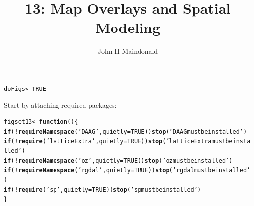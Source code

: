 \documentclass[12pt, a4paper,  BCOR=8.25mm, DIV=15]{scrartcl}\usepackage[]{graphicx}\usepackage[]{color}
\makeatletter
\newcommand{\hlnum}[1]{\textcolor[rgb]{0.686,0.059,0.569}{#1}}%
\newcommand{\hlstr}[1]{\textcolor[rgb]{0.192,0.494,0.8}{#1}}%
\newcommand{\hlopt}[1]{\textcolor[rgb]{0,0,0}{#1}}%
\newcommand{\hlstd}[1]{\textcolor[rgb]{0.345,0.345,0.345}{#1}}%
\newcommand{\hlkwa}[1]{\textcolor[rgb]{0.161,0.373,0.58}{\textbf{#1}}}%
\newcommand{\hlkwb}[1]{\textcolor[rgb]{0.69,0.353,0.396}{#1}}%
\newcommand{\hlkwc}[1]{\textcolor[rgb]{0.333,0.667,0.333}{#1}}%
\newcommand{\hlkwd}[1]{\textcolor[rgb]{0.737,0.353,0.396}{\textbf{#1}}}%
\newenvironment{kframe}{%
 \def\at@end@of@kframe{}%
 \ifinner\ifhmode%
  \def\at@end@of@kframe{\end{minipage}}%
  \begin{minipage}{\columnwidth}%
 \fi\fi%
 \def\FrameCommand##1{\hskip\@totalleftmargin \hskip-\fboxsep
 \colorbox{shadecolor}{##1}\hskip-\fboxsep
     \hskip-\linewidth \hskip-\@totalleftmargin \hskip\columnwidth}%
 \MakeFramed {\advance\hsize-\width
   \@totalleftmargin\z@ \linewidth\hsize
   \@setminipage}}%
 {\par\unskip\endMakeFramed%
 \at@end@of@kframe}
\newenvironment{knitrout}{}{} %
\makeatother
\begin{document}



\title{13: Map Overlays  and Spatial Modeling}
\author{John H Maindonald}
\maketitle

\vspace*{-0.5cm}
\begin{knitrout}
\color{fgcolor}\begin{kframe}
\begin{alltt}
\hlstd{doFigs} \hlkwb{<-} \hlnum{TRUE}
\end{alltt}
\end{kframe}
\end{knitrout}
\vspace*{-0.5cm}

Start by attaching required packages:

\begin{knitrout}
\color{fgcolor}\begin{kframe}
\begin{alltt}
\hlstd{figset13} \hlkwb{<-} \hlkwa{function}\hlstd{()\{}
  \hlkwa{if}\hlstd{(}\hlopt{!}\hlkwd{requireNamespace}\hlstd{(}\hlstr{'DAAG'}\hlstd{,} \hlkwc{quietly} \hlstd{=} \hlnum{TRUE}\hlstd{))}\hlkwd{stop}\hlstd{(}\hlstr{'DAAG must be installed'}\hlstd{)}
  \hlkwa{if}\hlstd{(}\hlopt{!}\hlkwd{require}\hlstd{(}\hlstr{'latticeExtra'}\hlstd{,} \hlkwc{quietly} \hlstd{=} \hlnum{TRUE}\hlstd{))}\hlkwd{stop}\hlstd{(}\hlstr{'latticeExtra must be installed'}\hlstd{)}
  \hlkwa{if}\hlstd{(}\hlopt{!}\hlkwd{requireNamespace}\hlstd{(}\hlstr{'oz'}\hlstd{,} \hlkwc{quietly} \hlstd{=} \hlnum{TRUE}\hlstd{))}\hlkwd{stop}\hlstd{(}\hlstr{'oz must be installed'}\hlstd{)}
  \hlkwa{if}\hlstd{(}\hlopt{!}\hlkwd{requireNamespace}\hlstd{(}\hlstr{'rgdal'}\hlstd{,} \hlkwc{quietly}\hlstd{=}\hlnum{TRUE}\hlstd{))}\hlkwd{stop}\hlstd{(}\hlstr{'rgdal must be installed'}\hlstd{)}
  \hlkwa{if}\hlstd{(}\hlopt{!}\hlkwd{require}\hlstd{(}\hlstr{'sp'}\hlstd{,} \hlkwc{quietly} \hlstd{=} \hlnum{TRUE}\hlstd{))}\hlkwd{stop}\hlstd{(}\hlstr{'sp must be installed'}\hlstd{)}
  \hlstd{\}}
\end{alltt}
\end{kframe}
\end{knitrout}
\end{document}
